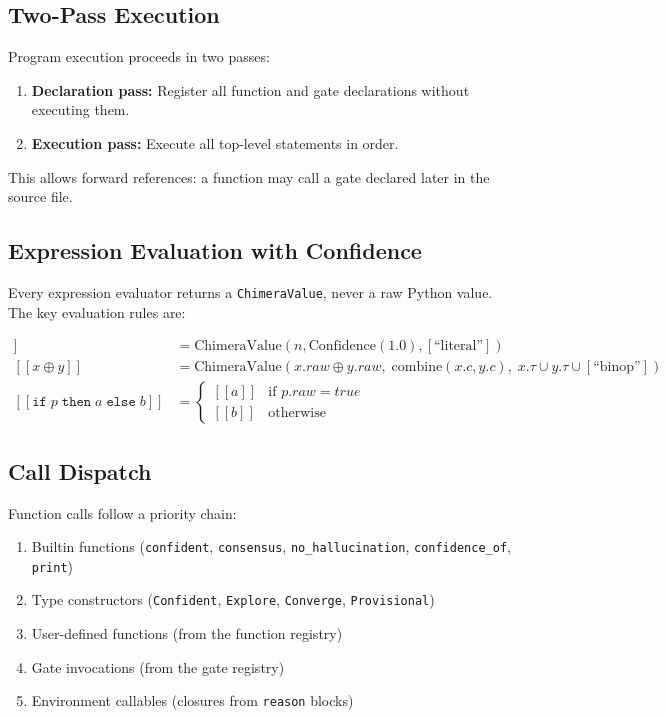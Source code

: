 \documentclass[11pt,a4paper]{article}
\providecommand{\llbracket}{[\![}
\providecommand{\rrbracket}{]\!]}
\begin{document}
\subsection{Two-Pass Execution}

Program execution proceeds in two passes:

\begin{enumerate}[leftmargin=2em]
  \item \textbf{Declaration pass:} Register all function and gate declarations
    without executing them.
  \item \textbf{Execution pass:} Execute all top-level statements in order.
\end{enumerate}

This allows forward references: a function may call a gate declared later in
the source file.

\subsection{Expression Evaluation with Confidence}

Every expression evaluator returns a \texttt{ChimeraValue}, never a raw
Python value. The key evaluation rules are:

\begin{align}
\llbracket n \rrbracket &= \mathrm{ChimeraValue}(n, \mathrm{Confidence}(1.0),
  [\text{``literal''}]) \label{eq:literal} \\
\llbracket x \oplus y \rrbracket &= \mathrm{ChimeraValue}(
  x.\mathit{raw} \oplus y.\mathit{raw},\;
  \mathrm{combine}(x.c, y.c),\;
  x.\tau \cup y.\tau \cup [\text{``binop''}]) \label{eq:binop} \\
\llbracket \texttt{if}\; p \;\texttt{then}\; a \;\texttt{else}\; b \rrbracket
  &= \begin{cases}
    \llbracket a \rrbracket & \text{if } p.\mathit{raw} = \textit{true} \\
    \llbracket b \rrbracket & \text{otherwise}
  \end{cases} \label{eq:if}
\end{align}

\subsection{Call Dispatch}

Function calls follow a priority chain:
\begin{enumerate}[leftmargin=2em]
  \item Builtin functions (\texttt{confident}, \texttt{consensus},
    \texttt{no\_hallucination}, \texttt{confidence\_of}, \texttt{print})
  \item Type constructors (\texttt{Confident}, \texttt{Explore},
    \texttt{Converge}, \texttt{Provisional})
  \item User-defined functions (from the function registry)
  \item Gate invocations (from the gate registry)
  \item Environment callables (closures from \texttt{reason} blocks)
\end{enumerate}
\end{document}
